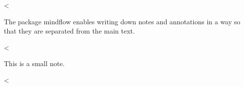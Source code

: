 <%

The package mindflow enables writing down notes and annotations in a way so that they are separated from the main text.

<%
\begin{mindflow}
This is a small note.
\end{mindflow}
<%
